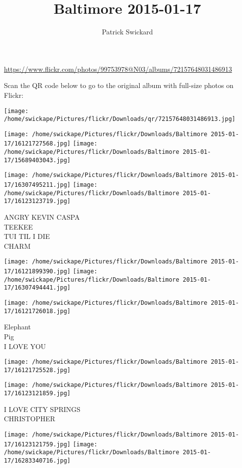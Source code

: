 \documentclass[10pt,letterpaper]{article}
\title{Baltimore 2015-01-17}
\author{Patrick Swickard}
\date{}
\begin{document}
\maketitle

\url{https://www.flickr.com/photos/99753978@N03/albums/72157648031486913}

Scan the QR code below to go to the original album with full-size photos on Flickr:

\texttt{[image: /home/swickape/Pictures/flickr/Downloads/qr/72157648031486913.jpg]}
\pagebreak

\texttt{[image: /home/swickape/Pictures/flickr/Downloads/Baltimore 2015-01-17/16121727568.jpg]}
\texttt{[image: /home/swickape/Pictures/flickr/Downloads/Baltimore 2015-01-17/15689403043.jpg]}

\texttt{[image: /home/swickape/Pictures/flickr/Downloads/Baltimore 2015-01-17/16307495211.jpg]}
\texttt{[image: /home/swickape/Pictures/flickr/Downloads/Baltimore 2015-01-17/16123123719.jpg]}

ANGRY KEVIN CASPA\\
TEEKEE\\
TUI TIL I DIE\\
CHARM
\pagebreak

\texttt{[image: /home/swickape/Pictures/flickr/Downloads/Baltimore 2015-01-17/16121899390.jpg]}
\texttt{[image: /home/swickape/Pictures/flickr/Downloads/Baltimore 2015-01-17/16307494441.jpg]}

\texttt{[image: /home/swickape/Pictures/flickr/Downloads/Baltimore 2015-01-17/16121726018.jpg]}

Elephant\\
Pig\\
I LOVE YOU
\pagebreak

\texttt{[image: /home/swickape/Pictures/flickr/Downloads/Baltimore 2015-01-17/16121725528.jpg]}

\vspace{0.25in}
\texttt{[image: /home/swickape/Pictures/flickr/Downloads/Baltimore 2015-01-17/16123121859.jpg]}

I LOVE CITY SPRINGS\\
CHRISTOPHER
\pagebreak

\texttt{[image: /home/swickape/Pictures/flickr/Downloads/Baltimore 2015-01-17/16123121759.jpg]}
\texttt{[image: /home/swickape/Pictures/flickr/Downloads/Baltimore 2015-01-17/16283340716.jpg]}
\end{document}
